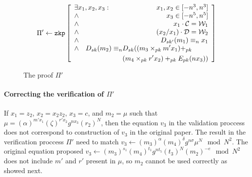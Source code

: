\begin{figure}[h]
    \begin{table}[H]
      \centering
      \begin{footnotesize}
        \[
        \Pi' \leftarrow \texttt{zkp} \begin{bmatrix}\begin{array}{lr}
                                          \exists x_1, x_2, x_3 : & x_1, x_2 \in [-n^3, n^3] \\
                                          \land & x_3 \in [-n^5, n^5] \\
                                          \land & x_1 \cdot \mathcal{C} = \mathcal{W}_1 \\
                                          \land & (x_2/x_1) \cdot \mathcal{D} = \mathcal{W}_2 \\
                                          \land & D_{sk'}(m_1) \equiv_n x_1 \\
                                          \multicolumn{2}{l}{
                                            \begin{aligned}[t]
                                                \land \quad D_{sk}(m_2) \equiv_n & D_{sk}((m_3 \times_{pk} m'x_1) +_{pk} \\
                                                                                 & (m_4 \times_{pk} r'x_2) +_{pk} E_{pk}(nx_3))
                                              \end{aligned}
                                          }
                                         \end{array}\end{bmatrix}
        \]
      \end{footnotesize}
    \end{table}

  \caption{The proof $\Pi'$}
  \label{fig:theProofPi2}
\end{figure}

\paragraph{Correcting the verification of $\Pi'$}
If $x_1 = z_2$, $x_2 = x_2 z_2$, $x_3 = c$, and $m_2 = \mu$ such that $\mu =
(\alpha)^{m' x_1} (\zeta)^{r' x_2} g^{nx_3} (r_2)^{N}$, then the equation $v_3$
in the validation proccess does not correspond to construction of $v_3$ in the
original paper. The result in the verification proccess $\Pi'$ need to match
$v_3 \leftarrow (m_3)^{\alpha} (m_4)^{\delta} g^{n \sigma} \mu^{N} \mod N^2$.
The original equation proposed $v_3 \leftarrow (m_3)^{s_1} (m_4)^{t_1} g^{nt_5}
(t_3)^{N} (m_2)^{-e} \mod N^2$ does not include $m'$ and $r'$ present in $\mu$,
so $m_2$ cannot be used correctly as showed next.

